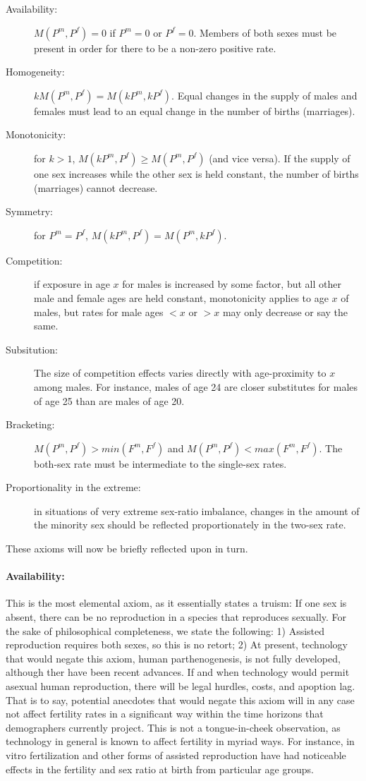 \begin{description}
  \item[Availability:] $M(P^m, P^f) = 0$ if $P^m = 0$ or $P^f = 0$. Members of
  both sexes must be present in order for there to be a non-zero positive rate.
  \item[Homogeneity:] $kM(P^m, P^f) = M(kP^m, kP^f)$. Equal
  changes in the supply of males and females must lead to an equal change in the
  number of births (marriages).
  \item[Monotonicity:] for $k > 1$, $M(kP^m, P^f) \ge M(P^m, P^f)$ (and vice
  versa). If the supply of one sex increases while the other sex is held constant, the number of
  births (marriages) cannot decrease.
  \item[Symmetry:] for $P^m = P^f$, $M(kP^m, P^f) = M(P^m, kP^f)$. 
  \item[Competition:] if exposure in age $x$ for males is increased by some
  factor, but all other male and female ages are held constant, monotonicity
  applies to age $x$ of males, but rates for male ages $<x$ or $>x$ may only
  decrease or say the same. 
  \item[Subsitution:] The size of competition effects varies directly with
  age-proximity to $x$ among males. For instance, males of age 24 are closer
  substitutes for males of age 25 than are males of age 20.
  \item[Bracketing:] $M(P^m, P^f) > min(F^m, F^f)$ and $M(P^m, P^f) < max(F^m,
  F^f)$. The both-sex rate must be intermediate to the single-sex rates.
  \item[Proportionality in the extreme:] in situations of very extreme sex-ratio
  imbalance, changes in the amount of the minority sex should be reflected proportionately
  in the two-sex rate.
\end{description}
 
These axioms will now be briefly reflected upon in turn.

\paragraph{Availability:} This is the most elemental axiom, as it essentially
states a truism: If one sex is absent, there can be no reproduction in a species
that reproduces sexually. For the sake of philosophical completeness, we state
the following: 1) Assisted reproduction requires both sexes, so this is no
retort; 2) At present, technology that would negate this axiom, human
parthenogenesis, is not fully developed, although ther have been recent
advances\citep{revazova2007patient}. If and when technology would permit asexual
human reproduction, there will be legal hurdles, costs, and apoption lag. 
That is to say, potential anecdotes that would negate this axiom
will in any case not affect fertility rates in a significant way within the time
horizons that demographers currently project. This is not a tongue-in-cheek
observation, as technology in general is known to affect fertility in myriad
ways. For instance, in vitro fertilization and other forms of assisted
reproduction have had noticeable effects in the fertility and sex ratio at birth from particular
age groups.

